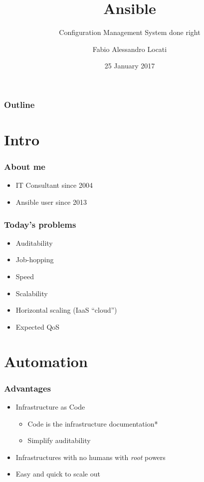 \documentclass[t,aspectratio=169]{beamer}
\title{Ansible}
\subtitle{Configuration Management System done right}
\author{Fabio Alessandro Locati}
\date{25 January 2017}
\institute{Senior Cloud Consultant}
\begin{document}
\maketitle

\begin{frame}
    \frametitle{Outline}
    \tableofcontents
\end{frame}

\section{Intro}
\begin{frame}
    \frametitle{About me}
    \begin{itemize}
        \item<2-> IT Consultant since 2004
        \item<3-> Ansible user since 2013
    \end{itemize}
\end{frame}

\begin{frame}
    \frametitle{Today's problems}
    \begin{itemize}
        \item<2-> Auditability
        \item<3-> Job-hopping
        \item<4-> Speed
        \item<5-> Scalability
        \item<6-> Horizontal scaling (IaaS ``cloud'')
        \item<7-> Expected QoS
    \end{itemize}
\end{frame}

\section{Automation}

\begin{frame}
    \frametitle{Advantages}
    \begin{itemize}
        \item<2-> Infrastructure as Code
        \begin{itemize}
            \item<3-> Code is the infrastructure documentation*
            \item<4-> Simplify auditability
        \end{itemize}
        \item<5-> Infrastructures with no humans with \textit{root} powers
        \item<6-> Easy and quick to scale out
    \end{itemize}
\end{frame}
\end{document}
